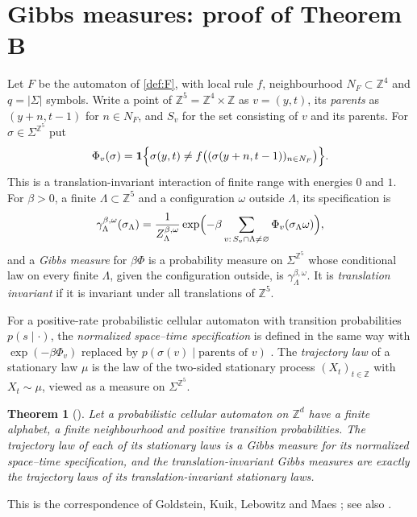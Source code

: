 \documentclass[11pt]{article}
\theoremstyle{plain}
\newtheorem{theorem}{Theorem}[section]
\theoremstyle{definition}
\theoremstyle{remark}
\newcommand{\Z}{\mathbb Z}
\newcommand{\ind}{\mathbf 1}
\begin{document}
\section{Gibbs measures: proof of Theorem B}\label{sec:gibbs}

Let $F$ be the automaton of \cref{def:F}, with local rule $f$, neighbourhood $N_F\subset\Z^4$ and $q=|\Sigma|$ symbols. Write a point of $\Z^5=\Z^4\times\Z$ as $v=(y,t)$, its \emph{parents} as $(y+n,t-1)$ for $n\in N_F$, and $S_v$ for the set consisting of $v$ and its parents. For $\sigma\in\Sigma^{\Z^5}$ put
\[
\Phi_v(\sigma)=\ind\Bigl\{\sigma(y,t)\ne f\bigl((\sigma(y+n,t-1))_{n\in N_F}\bigr)\Bigr\}.
\]
This is a translation-invariant interaction of finite range with energies $0$ and $1$. For $\beta>0$, a finite $\Lambda\subset\Z^5$ and a configuration $\omega$ outside $\Lambda$, its specification is
\[
\gamma^{\beta,\omega}_\Lambda(\sigma_\Lambda)=\frac1{Z^{\beta,\omega}_\Lambda}\exp\Bigl(-\beta\sum_{v:\,S_v\cap\Lambda\ne\varnothing}\Phi_v(\sigma_\Lambda\omega)\Bigr),
\]
and a \emph{Gibbs measure} for $\beta\Phi$ is a probability measure on $\Sigma^{\Z^5}$ whose conditional law on every finite $\Lambda$, given the configuration outside, is $\gamma^{\beta,\omega}_\Lambda$. It is \emph{translation invariant} if it is invariant under all translations of $\Z^5$.

For a positive-rate probabilistic cellular automaton with transition probabilities $p(s\mid\cdot)$, the \emph{normalized space--time specification} is defined in the same way with $\exp(-\beta\Phi_v)$ replaced by $p(\sigma(v)\mid\text{parents of }v)$ \cite[equation~(6)]{DMst}. The \emph{trajectory law} of a stationary law $\mu$ is the law of the two-sided stationary process $(X_t)_{t\in\Z}$ with $X_t\sim\mu$, viewed as a measure on $\Sigma^{\Z^5}$.

\begin{theorem}[{\cite[Lemma~2.4 and Corollary~10.4]{DMst}}]\label{thm:gklm}
Let a probabilistic cellular automaton on $\Z^d$ have a finite alphabet, a finite neighbourhood and positive transition probabilities. The trajectory law of each of its stationary laws is a Gibbs measure for its normalized space--time specification, and the translation-invariant Gibbs measures are exactly the trajectory laws of its translation-invariant stationary laws.
\end{theorem}

This is the correspondence of Goldstein, Kuik, Lebowitz and Maes \cite{GKLM89}; see also \cite{LMS90}.
\end{document}
